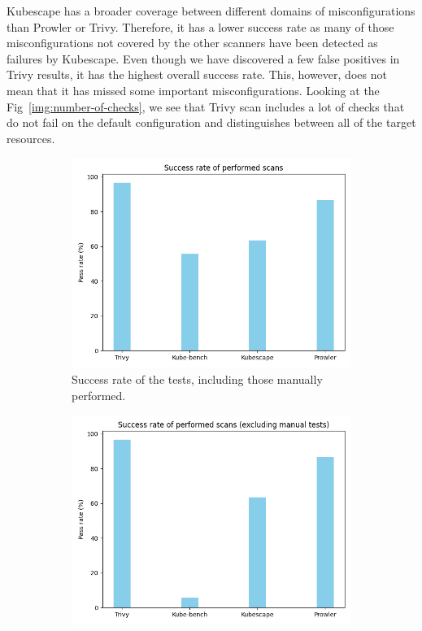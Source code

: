 Kubescape has a broader coverage between different domains of misconfigurations than Prowler or Trivy. Therefore, it has a lower success rate as many of those misconfigurations not covered by the other scanners have been detected as failures by Kubescape. Even though we have discovered a few false positives in Trivy results, it has the highest overall success rate. This, however, does not mean that it has missed some important misconfigurations. Looking at the Fig~\ref{img:number-of-checks}, we see that Trivy scan includes a lot of checks that do not fail on the default configuration and distinguishes between all of the target resources. 

\begin{figure}[!h]
        \centering
        \begin{subfigure}{.4\textwidth}
        \centering
        \includegraphics[width=\textwidth]{images/success-rate.png}
        \caption{Success rate of the tests, including those manually performed.}
        \label{img:success-rate-with-manual}
        \end{subfigure}
        \begin{subfigure}{.4\textwidth}
        \centering
        \includegraphics[width=\textwidth]{images/success-rate-no-manual.png}

\end{subfigure}
\end{figure}
